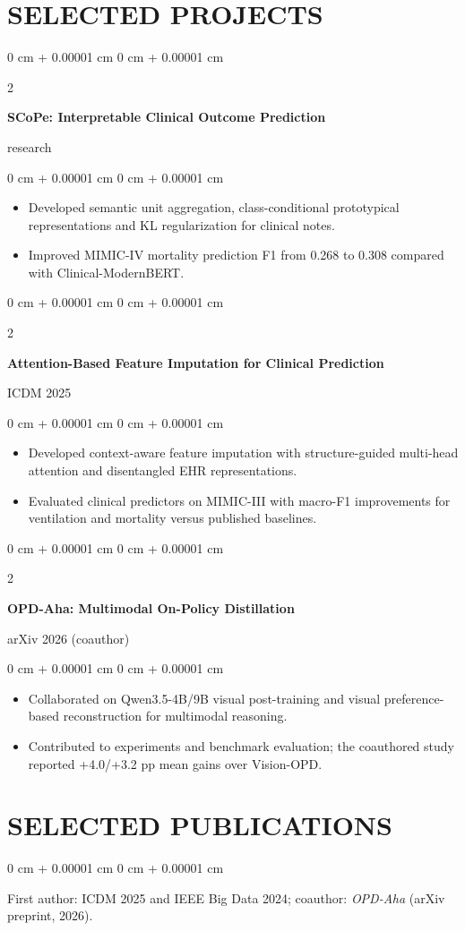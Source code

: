 \documentclass[10pt, letterpaper]{article}
\newenvironment{highlights}{
    \begin{itemize}[
        topsep=0.10 cm,
        parsep=0.10 cm,
        partopsep=0pt,
        itemsep=0pt,
        leftmargin=0 cm + 10pt
    ]
}{
    \end{itemize}
} %
\newenvironment{onecolentry}{
    \begin{adjustwidth}{
        0 cm + 0.00001 cm
    }{
        0 cm + 0.00001 cm
    }
}{
    \end{adjustwidth}
} %
\newenvironment{twocolentry}[2][]{
    \onecolentry
    \def\secondColumn{#2}
    \setcolumnwidth{\fill, 4.5 cm}
    \begin{paracol}{2}
}{
    \switchcolumn \raggedleft \secondColumn
    \end{paracol}
    \endonecolentry
} %
\begin{document}
\section{SELECTED PROJECTS}
\begin{twocolentry}{2026 research}
\textbf{SCoPe: Interpretable Clinical Outcome Prediction}
\end{twocolentry}
\begin{onecolentry}
\begin{highlights}
\item Developed semantic unit aggregation, class-conditional prototypical representations and KL regularization for clinical notes.
\item Improved MIMIC-IV mortality prediction F1 from 0.268 to 0.308 compared with Clinical-ModernBERT.
\end{highlights}
\end{onecolentry}
\vspace{0.03 cm}
\begin{twocolentry}{ICDM 2025}
\textbf{Attention-Based Feature Imputation for Clinical Prediction}
\end{twocolentry}
\begin{onecolentry}
\begin{highlights}
\item Developed context-aware feature imputation with structure-guided multi-head attention and disentangled EHR representations.
\item Evaluated clinical predictors on MIMIC-III with macro-F1 improvements for ventilation and mortality versus published baselines.
\end{highlights}
\end{onecolentry}
\vspace{0.03 cm}
\begin{twocolentry}{arXiv 2026 (coauthor)}
\textbf{OPD-Aha: Multimodal On-Policy Distillation}
\end{twocolentry}
\begin{onecolentry}
\begin{highlights}
\item Collaborated on Qwen3.5-4B/9B visual post-training and visual preference-based reconstruction for multimodal reasoning.
\item Contributed to experiments and benchmark evaluation; the coauthored study reported +4.0/+3.2 pp mean gains over Vision-OPD.
\end{highlights}
\end{onecolentry}
\vspace{0.03 cm}
\section{SELECTED PUBLICATIONS}
\begin{onecolentry}
First author: ICDM 2025 and IEEE Big Data 2024; coauthor: \textit{OPD-Aha} (arXiv preprint, 2026).
\end{onecolentry}
\end{document}
